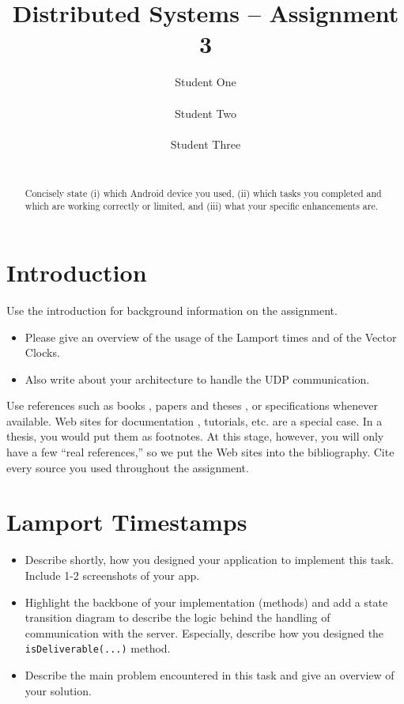 \documentclass{report}
\title{Distributed Systems -- Assignment 3}
\author{
%
%
\alignauthor Student One\\
	\affaddr{ETH ID XX-XXX-XXX}\\
	\email{one@student.ethz.ch}
\alignauthor Student Two\\
	\affaddr{ETH ID XX-XXX-XXX}\\
	\email{two@student.ethz.ch}
\alignauthor Student Three\\
	\affaddr{ETH ID XX-XXX-XXX}\\
	\email{three@student.ethz.ch}
}
\begin{document}
\maketitle

\begin{abstract}
Concisely state (i) which Android device you used, (ii) which tasks you completed and which are working correctly or limited, and (iii) what your specific enhancements are.
\end{abstract}

\section{Introduction}

Use the introduction for background information on the assignment.
\begin{itemize}
  \item Please give an overview of the usage of the Lamport times and of the Vector Clocks.
  \item Also write about your architecture to handle the UDP communication.
\end{itemize}

Use references such as books \cite{hello}, papers and theses \cite{REST}, or specifications \cite{RFC2616} whenever available.
Web sites for documentation \cite{devServices}, tutorials, etc. are a special case.
In a thesis, you would put them as footnotes. At this stage, however, you will only have a few ``real references,'' so we put the Web sites into the bibliography.
Cite every source you used throughout the assignment.

\section{Lamport Timestamps}
\begin{itemize}
  \item Describe shortly, how you designed your application to implement this task. Include 1-2 screenshots of your app.
  \item Highlight the backbone of your implementation (methods) and add a state transition diagram to describe the logic behind the handling of communication with the server. Especially, describe how you designed the \texttt{isDeliverable(...)} method.
  \item Describe the main problem encountered in this task and give an overview of your solution.
\end{itemize}
\end{document}
